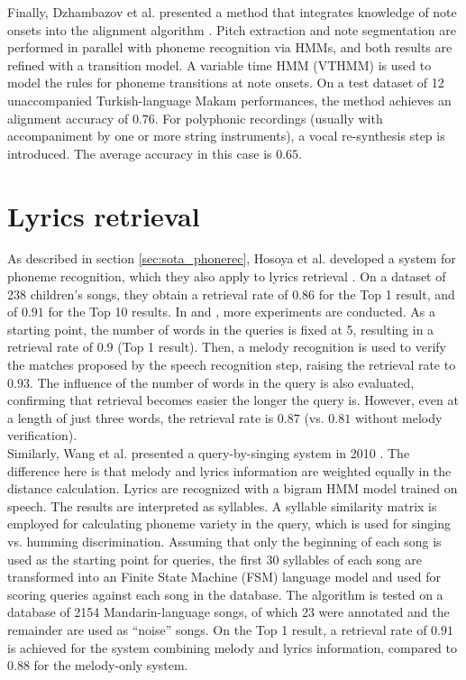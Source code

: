 Finally, Dzhambazov et al. presented a method that integrates knowledge of note onsets into the alignment algorithm \cite{dzhambazov_alignment}. Pitch extraction and note segmentation are performed in parallel with phoneme recognition via HMMs, and both results are refined with a transition model. A variable time HMM (VTHMM) is used to model the rules for phoneme transitions at note onsets.
On a test dataset of 12 unaccompanied Turkish-language Makam performances, the method achieves an alignment accuracy of $0.76$. For polyphonic recordings (usually with accompaniment by one or more string instruments), a vocal re-synthesis step is introduced. The average accuracy in this case is $0.65$.\\




\section{Lyrics retrieval}
As described in section \ref{sec:sota_phonerec}, Hosoya et al. developed a system for phoneme recognition, which they also apply to lyrics retrieval \cite{Hosoya2005}. On a dataset of 238 children's songs, they obtain a retrieval rate of $0.86$ for the Top 1 result, and of $0.91$ for the Top 10 results. In \cite{suzuki06} and \cite{suzuki07}, more experiments are conducted. As a starting point, the number of words in the queries is fixed at 5, resulting in a retrieval rate of $0.9$ (Top 1 result). Then, a melody recognition is used to verify the matches proposed by the speech recognition step, raising the retrieval rate to $0.93$. The influence of the number of words in the query is also evaluated, confirming that retrieval becomes easier the longer the query is. However, even at a length of just three words, the retrieval rate is $0.87$ (vs. $0.81$ without melody verification).\\

Similarly, Wang et al. presented a query-by-singing system in 2010 \cite{Wang2010}. The difference here is that melody and lyrics information are weighted equally in the distance calculation. Lyrics are recognized with a bigram HMM model trained on speech. The results are interpreted as syllables. A syllable similarity matrix is employed for calculating phoneme variety in the query, which is used for singing vs. humming discrimination. Assuming that only the beginning of each song is used as the starting point for queries, the first 30 syllables of each song are transformed into an Finite State Machine (FSM) language model and used for scoring queries against each song in the database. The algorithm is tested on a database of 2154 Mandarin-language songs, of which 23 were annotated and the remainder are used as ``noise'' songs. On the Top 1 result, a retrieval rate of $0.91$ is achieved for the system combining melody and lyrics information, compared to $0.88$ for the melody-only system.\\

